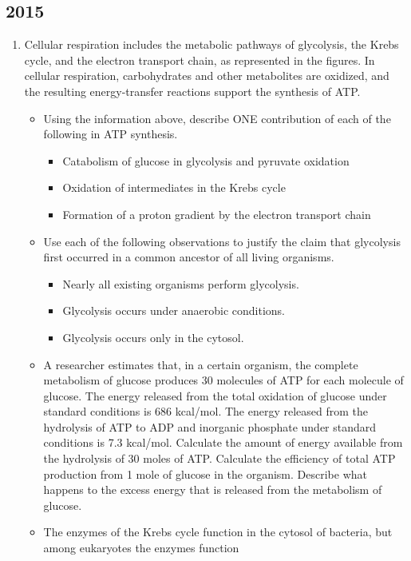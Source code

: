 \documentclass{article}
\begin{document}
\subsection{2015}
\begin{enumerate}
\item Cellular respiration includes the metabolic pathways of glycolysis, the Krebs cycle, and the electron transport 
chain, as represented in the figures. In cellular respiration, carbohydrates and other metabolites are oxidized, and the 
resulting energy-transfer reactions support the synthesis of ATP.
\begin{itemize}
\item Using the information above, describe ONE contribution of each of the following in ATP synthesis.
\begin{itemize}
\item Catabolism of glucose in glycolysis and pyruvate oxidation
\item Oxidation of intermediates in the Krebs cycle 
\item Formation of a proton gradient by the electron transport chain 
\end{itemize}
\item Use each of the following observations to justify the claim that glycolysis first occurred in a common ancestor of all living organisms. 
\begin{itemize}
\item Nearly all existing organisms perform glycolysis. 
\item Glycolysis occurs under anaerobic conditions. 
\item Glycolysis occurs only in the cytosol.
\end{itemize}
\item A researcher estimates that, in a certain organism, the complete metabolism of glucose produces 30 molecules of ATP for each molecule of glucose. The energy released from the total oxidation of glucose 
under standard conditions is 686 kcal/mol. The energy released from the hydrolysis of ATP to ADP and inorganic phosphate under standard conditions is 7.3 kcal/mol. Calculate the amount of energy available from the 
hydrolysis of 30 moles of ATP. Calculate the efficiency of total ATP production from 1 mole of glucose in the organism. Describe what happens to the excess energy that is released from the metabolism of glucose. 
\item The enzymes of the Krebs cycle function in the cytosol of bacteria, but among eukaryotes the enzymes function 

\end{itemize}
\end{enumerate}
\end{document}
